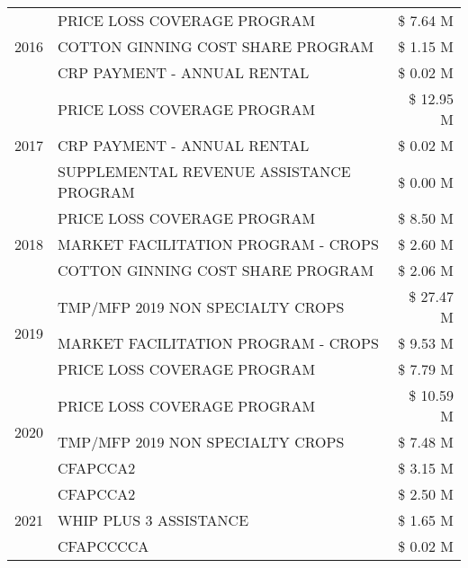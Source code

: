 \begin{tabular}{llr}
\multirow[t]{3}{*}{2016} & PRICE LOSS COVERAGE PROGRAM & \$ 7.64 M \\
 & COTTON GINNING COST SHARE PROGRAM & \$ 1.15 M \\
 & CRP PAYMENT - ANNUAL RENTAL & \$ 0.02 M \\
\cline{1-3}
\multirow[t]{3}{*}{2017} & PRICE LOSS COVERAGE PROGRAM & \$ 12.95 M \\
 & CRP PAYMENT - ANNUAL RENTAL & \$ 0.02 M \\
 & SUPPLEMENTAL REVENUE ASSISTANCE PROGRAM & \$ 0.00 M \\
\cline{1-3}
\multirow[t]{3}{*}{2018} & PRICE LOSS COVERAGE PROGRAM & \$ 8.50 M \\
 & MARKET FACILITATION PROGRAM - CROPS & \$ 2.60 M \\
 & COTTON GINNING COST SHARE PROGRAM & \$ 2.06 M \\
\cline{1-3}
\multirow[t]{3}{*}{2019} & TMP/MFP 2019 NON SPECIALTY CROPS & \$ 27.47 M \\
 & MARKET FACILITATION PROGRAM - CROPS & \$ 9.53 M \\
 & PRICE LOSS COVERAGE PROGRAM & \$ 7.79 M \\
\cline{1-3}
\multirow[t]{3}{*}{2020} & PRICE LOSS COVERAGE PROGRAM & \$ 10.59 M \\
 & TMP/MFP 2019 NON SPECIALTY CROPS & \$ 7.48 M \\
 & CFAPCCA2 & \$ 3.15 M \\
\cline{1-3}
\multirow[t]{3}{*}{2021} & CFAPCCA2 & \$ 2.50 M \\
 & WHIP PLUS 3 ASSISTANCE & \$ 1.65 M \\
 & CFAPCCCCA & \$ 0.02 M \\
\cline{1-3}
\bottomrule
\end{tabular}
